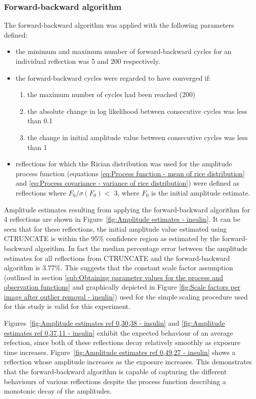 \subsubsection{Forward-backward algorithm}
\label{subs:Forward-backward algorithm - insulin}
The forward-backward algorithm was applied with the following parameters defined:
\begin{itemize}
    \item the minimum and maximum number of forward-backward cycles for an individual reflection was 5 and 200 respectively.
    \item the forward-backward cycles were regarded to have converged if:
    \begin{enumerate}
        \item the maximum number of cycles had been reached (200)
        \item the absolute change in log likelihood between consecutive cycles was less than 0.1
        \item the change in initial amplitude value between consecutive cycles was less than 1
    \end{enumerate}
    \item reflections for which the Rician distribution was used for the amplitude process function (equations \ref{eq:Process function - mean of rice distribution} and \ref{eq:Process covariance - variance of rice distribution}) were defined as reflections where $F_0/\sigma(F_0) <$ 3, where $F_0$ is the initial amplitude estimate.
\end{itemize}
Amplitude estimates resulting from applying the forward-backward algorithm for 4 reflections are shown in Figure~\ref{fig:Amplitude estimates - insulin}.
It can be seen that for these reflections, the initial amplitude value estimated using CTRUNCATE is within the 95\% confidence region as estimated by the forward-backward algorithm.
In fact the median percentage error between the amplitude estimates for all reflections from CTRUNCATE and the forward-backward algorithm is 3.77\%.
This suggests that the constant scale factor assumption (outlined in section \ref{sub:Obtaining parameter values for the process and observation functions} and graphically depicted in Figure \ref{fig:Scale factors per image after outlier removal - insulin}) used for the simple scaling procedure used for this study is valid for this experiment.

Figures~\ref{fig:Amplitude estimates ref 0,30,38 - insulin} and \ref{fig:Amplitude estimates ref 0,37,11 - insulin} exhibit the expected behaviour of an average refection, since both of these reflections decay relatively smoothly as exposure time increases.
Figure~\ref{fig:Amplitude estimates ref 0,49,27 - insulin} shows a reflection whose amplitude increases as the exposure increases.
This demonstrates that the forward-backward algorithm is capable of capturing the different behaviours of various reflections despite the process function describing a monotonic decay of the amplitudes.

